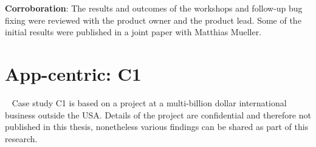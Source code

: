 \textbf{Corroboration}: The results and outcomes of the workshops and follow-up bug fixing were reviewed with the product owner and the product lead. Some of the initial results were published in a joint paper with Matthias Mueller.





\section{App-centric: C1}~\label{case-study-overview-C1}
Case study C1 is based on a project at a multi-billion dollar international business outside the USA. Details of the project are confidential and therefore not published in this thesis, nonetheless various findings can be shared as part of this research. 

